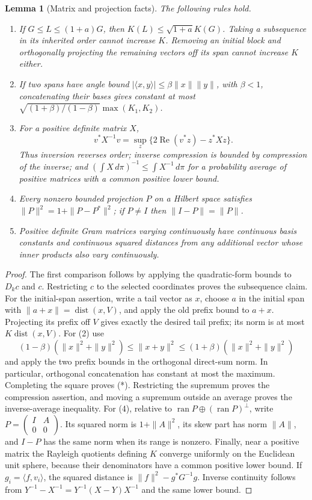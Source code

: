 \documentclass[reqno,a4paper,12pt]{amsart}
\newtheorem{lemma}[theorem]{Lemma}
\newcommand{\dist}{\operatorname{dist}}
\newcommand{\ip}[2]{\langle #1,#2\rangle}
\begin{document}
\begin{lemma}[Matrix and projection facts]\label{matrixfacts}
The following rules hold.
\begin{enumerate}
\item If $G\le L\le(1+a)G$, then $K(L)\le\sqrt{1+a}K(G)$.
Taking a subsequence in its inherited order cannot increase $K$.
Removing an initial block and orthogonally projecting the remaining
vectors off its span cannot increase $K$ either.
\item If two spans have angle bound
$|\ip{x}{y}|\le\beta\|x\|\|y\|$, with $\beta<1$, concatenating their
bases gives constant at most
$\sqrt{(1+\beta)/(1-\beta)}\max(K_1,K_2)$.
\item For a positive definite matrix $X$,
\[
 v^*X^{-1}v=\sup_z\{2\operatorname{Re}(v^*z)-z^*Xz\}.
 \tag{*}
\]
Thus inversion reverses order; inverse compression is bounded by
compression of the inverse; and
$(\int X\,d\pi)^{-1}\le\int X^{-1}\,d\pi$
for a probability average of positive matrices with a common positive lower bound.
\item Every nonzero bounded projection $P$ on a Hilbert space satisfies
$\|P\|^2=1+\|P-P^*\|^2$; if $P\ne I$ then $\|I-P\|=\|P\|$.
\item Positive definite Gram matrices varying continuously have continuous
basis constants and continuous squared distances from any additional vector
whose inner products also vary continuously.
\end{enumerate}
\end{lemma}
\begin{proof}
The first comparison follows by applying the quadratic-form bounds to
$D_kc$ and $c$. Restricting $c$ to the selected coordinates proves the
subsequence claim. For the initial-span assertion, write a tail vector as
$x$, choose $a$ in the initial span with $\|a+x\|=\dist(x,V)$, and apply
the old prefix bound to $a+x$. Projecting its prefix off $V$ gives exactly
the desired tail prefix; its norm is at most $K\dist(x,V)$.
For (2) use
\[
 (1-\beta)(\|x\|^2+\|y\|^2)\le\|x+y\|^2
 \le(1+\beta)(\|x\|^2+\|y\|^2)
\]
and apply the two prefix bounds in the orthogonal direct-sum norm.
In particular, orthogonal concatenation has constant at most the maximum.
Completing the square proves (*). Restricting the supremum proves the
compression assertion, and moving a supremum outside an average proves
the inverse-average inequality. For (4), relative to
$\operatorname{ran}P\oplus(\operatorname{ran}P)^\perp$, write
$P=\left(\begin{smallmatrix}I&A\\0&0\end{smallmatrix}\right)$.
Its squared norm is $1+\|A\|^2$, its skew part has norm $\|A\|$, and
$I-P$ has the same norm when its range is nonzero.
Finally, near a positive matrix the Rayleigh quotients defining $K$
converge uniformly on the Euclidean unit sphere, because their
denominators have a common positive lower bound. If $g_i=\ip{f}{v_i}$,
the squared distance is $\|f\|^2-g^*G^{-1}g$.
Inverse continuity follows from
$Y^{-1}-X^{-1}=Y^{-1}(X-Y)X^{-1}$ and the same lower bound.
\end{proof}
\end{document}
